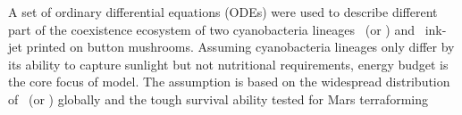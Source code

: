 \documentclass[../thesis.tex]{subfiles} %
\begin{document}
A set of ordinary differential equations (ODEs) were used to describe different part of the coexistence ecosystem of two cyanobacteria lineages \As\ (or \Ss) and \Cs\ ink-jet printed on button mushrooms.\autocite{joshi2018bacterial}  Assuming cyanobacteria lineages only differ by its ability to capture sunlight but not nutritional requirements,\autocite{giraldo2014plant} energy budget is the core focus of model.  The assumption is based on the widespread distribution of \As\ (or \Ss) globally\autocite{joshi2018bacterial,sawa2017electricity} and the tough survival ability tested for Mars terraforming\autocite{baque2013boss}
\end{document}

